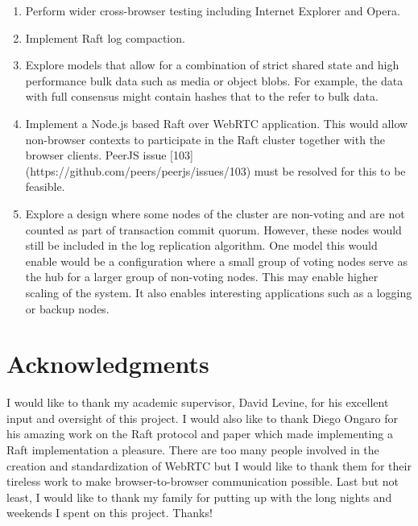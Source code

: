 \documentclass[9pt]{extarticle}
\begin{document}
\begin{multicols}{2}
\begin{enumerate}
\item Perform wider cross-browser testing including Internet Explorer and
  Opera.
\item Implement Raft log compaction.
\item Explore models that allow for a combination of strict shared state
  and high performance bulk data such as media or object blobs. For
  example, the data with full consensus might contain hashes that to
  the refer to bulk data.
\item Implement a Node.js based Raft over WebRTC application. This would
  allow non-browser contexts to participate in the Raft cluster
  together with the browser clients. PeerJS issue
  [103](https://github.com/peers/peerjs/issues/103) must be resolved
  for this to be feasible.
\item Explore a design where some nodes of the cluster are non-voting and
  are not counted as part of transaction commit quorum. However, these
  nodes would still be included in the log replication algorithm. One
  model this would enable would be a configuration where a small group
  of voting nodes serve as the hub for a larger group of non-voting
  nodes. This may enable higher scaling of the system. It also enables
  interesting applications such as a logging or backup nodes.
\end{enumerate}


\section*{Acknowledgments}
I would like to thank my academic supervisor, David Levine, for his
excellent input and oversight of this project. I would also like to
thank Diego Ongaro for his amazing work on the Raft protocol and paper
which made implementing a Raft implementation a pleasure. There are
too many people involved in the creation and standardization of WebRTC
but I would like to thank them for their tireless work to make
browser-to-browser communication possible. Last but not least, I would
like to thank my family for putting up with the long nights and
weekends I spent on this project. Thanks!


\end{multicols}
\end{document}
